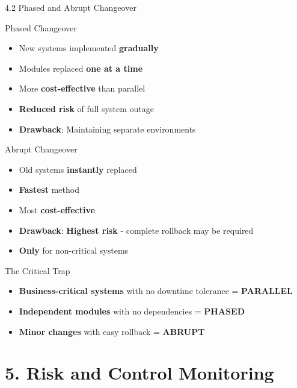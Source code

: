 \documentclass{beamer}
\begin{document}
	\begin{frame}{4.2 Phased and Abrupt Changeover}
		\begin{block}{Phased Changeover}
			\begin{itemize}
				\item New systems implemented \textbf{gradually}
				\item Modules replaced \textbf{one at a time}
				\item More \textbf{cost-effective} than parallel
				\item \textbf{Reduced risk} of full system outage
				\item \textbf{Drawback}: Maintaining separate environments
			\end{itemize}
		\end{block}
		
		\begin{block}{Abrupt Changeover}
			\begin{itemize}
				\item Old systems \textbf{instantly} replaced
				\item \textbf{Fastest} method
				\item Most \textbf{cost-effective}
				\item \textbf{Drawback}: \textbf{Highest risk} - complete rollback may be required
				\item \textbf{Only} for non-critical systems
			\end{itemize}
		\end{block}
		
		\begin{alertblock}{The Critical Trap}
			\begin{itemize}
				\item \textbf{Business-critical systems} with no downtime tolerance = \textbf{PARALLEL}
				\item \textbf{Independent modules} with no dependencies = \textbf{PHASED}
				\item \textbf{Minor changes} with easy rollback = \textbf{ABRUPT}
			\end{itemize}
		\end{alertblock}
	\end{frame}
	
	\section{5. Risk and Control Monitoring}
	
\end{document}
